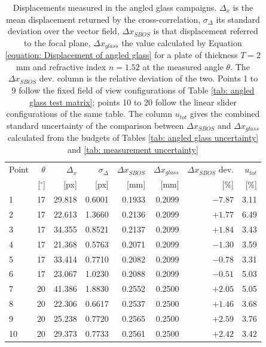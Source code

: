 \begin{table}[htbp]
    \centering
    \caption[Displacements measured in the angled glass campaigns]{Displacements measured in the angled glass campaigns. $\Delta_x$ is the mean displacement returned by the cross-correlation, $\sigma_\Delta$ its standard deviation over the vector field, $\Delta x_{SBOS}$ is that displacement referred to the focal plane, $\Delta x_{glass}$ the value calculated by Equation \ref{equation: Displacement of angled glass} for a plate of thickness $T = 2$ mm and refractive index $n = 1.52$ at the measured angle $\theta$. The $\Delta x_{SBOS}$ dev. column is the relative deviation of the two. Points 1 to 9 follow the fixed field of view configurations of Table \ref{tab: angled glass test matrix}; points 10 to 20 follow the linear slider configurations of the same table. The column $u_{tot}$ gives the combined standard uncertainty of the comparison between $\Delta x_{SBOS}$ and $\Delta x_{glass}$ calculated from the budgets of Tables \ref{tab: angled glass uncertainty} and \ref{tab: measurement uncertainty}}
    \label{tab: angled glass displacement results}
    \begin{tabular}{lrrrrrrr}
        \toprule
        Point & $\theta$ & $\Delta_x$ & $\sigma_\Delta$ & $\Delta x_{SBOS}$ & $\Delta x_{glass}$ & $\Delta x_{SBOS}$ dev. & $u_{tot}$ \\
              & [$^{\circ}$] & [px] & [px] & [mm] & [mm] & [\%] & [\%] \\
        \midrule
         1 & 17 & 29.818 & 0.6001 & 0.1933 & 0.2099 & $-7.87$ &  3.11 \\
         2 & 17 & 22.613 & 1.3660 & 0.2136 & 0.2099 & $+1.77$ &  6.49 \\
         3 & 17 & 34.355 & 0.8521 & 0.2137 & 0.2099 & $+1.84$ &  3.43 \\
         4 & 17 & 21.368 & 0.5763 & 0.2071 & 0.2099 & $-1.30$ &  3.59 \\
         5 & 17 & 33.414 & 0.7710 & 0.2082 & 0.2099 & $-0.78$ &  3.31 \\
         6 & 17 & 23.067 & 1.0230 & 0.2088 & 0.2099 & $-0.51$ &  5.03 \\
         7 & 20 & 41.386 & 1.8830 & 0.2552 & 0.2500 & $+2.05$ &  5.05 \\
         8 & 20 & 22.306 & 0.6617 & 0.2537 & 0.2500 & $+1.46$ &  3.68 \\
         9 & 20 & 25.238 & 0.7720 & 0.2565 & 0.2500 & $+2.59$ &  3.76 \\
        \midrule
        10 & 20 & 29.373 & 0.7733 & 0.2561 & 0.2500 & $+2.42$ &  3.42 \\

\end{tabular}
\end{table}
